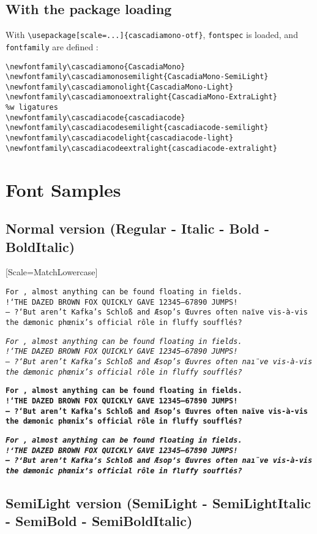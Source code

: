 \documentclass{article}
\newcommand\demotext{For \textsterling 45, almost anything can be found floating in fields.\\
	!`THE DAZED BROWN FOX QUICKLY GAVE 12345--67890 JUMPS!\\
	--- ?`But aren't Kafka's Schlo\ss{} and \AE sop's \OE uvres often na\"\i ve vis-\`a-vis the d\ae monic ph\oe nix's official r\^ole in fluffy souffl\'es?
}
\begin{document}
\subsection{With the package loading}

With \lstinline[language={[latex]TeX},basicstyle=\ttfamily]|\usepackage[scale=...]{cascadiamono-otf}|, \lstinline[language={[latex]TeX},basicstyle=\ttfamily]|fontspec| is loaded, and \lstinline[language={[latex]TeX},basicstyle=\ttfamily]|fontfamily| are defined :

\begin{lstlisting}[language={[latex]TeX},basicstyle=\footnotesize\ttfamily,commentstyle=\itshape\color{gray},keywordstyle=\color{magenta},tabsize=4,frame=single]
%w/o ligatures
\newfontfamily\cascadiamono{CascadiaMono}
\newfontfamily\cascadiamonosemilight{CascadiaMono-SemiLight}
\newfontfamily\cascadiamonolight{CascadiaMono-Light}
\newfontfamily\cascadiamonoextralight{CascadiaMono-ExtraLight}
%w ligatures
\newfontfamily\cascadiacode{cascadiacode}
\newfontfamily\cascadiacodesemilight{cascadiacode-semilight}
\newfontfamily\cascadiacodelight{cascadiacode-light}
\newfontfamily\cascadiacodeextralight{cascadiacode-extralight}
\end{lstlisting}

\section{Font Samples}

\subsection{Normal version (Regular - Italic - Bold - BoldItalic)}

\setmonofont{CascadiaMono}[Scale=MatchLowercase]

\texttt{\demotext}\par\bigskip

\texttt{\textit{\demotext}}\par\bigskip

\texttt{\textbf{\demotext}}\par\bigskip

\texttt{\textbf{\textit{\demotext}}}\par

\subsection{SemiLight version (SemiLight - SemiLightItalic - SemiBold - SemiBoldItalic)}
\end{document}
